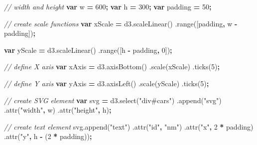 \documentclass[openany]{book}
\newenvironment{Shaded}{\begin{snugshade}}{\end{snugshade}}
\newcommand{\AttributeTok}[1]{\textcolor[rgb]{0.77,0.63,0.00}{#1}}
\newcommand{\CommentTok}[1]{\textcolor[rgb]{0.56,0.35,0.01}{\textit{#1}}}
\newcommand{\DecValTok}[1]{\textcolor[rgb]{0.00,0.00,0.81}{#1}}
\newcommand{\KeywordTok}[1]{\textcolor[rgb]{0.13,0.29,0.53}{\textbf{#1}}}
\newcommand{\NormalTok}[1]{#1}
\newcommand{\OperatorTok}[1]{\textcolor[rgb]{0.81,0.36,0.00}{\textbf{#1}}}
\newcommand{\StringTok}[1]{\textcolor[rgb]{0.31,0.60,0.02}{#1}}
\newcommand{\VariableTok}[1]{\textcolor[rgb]{0.00,0.00,0.00}{#1}}
\begin{document}
\begin{Shaded}
\begin{Highlighting}[]
\CommentTok{// width and height}
\KeywordTok{var}\NormalTok{ w }\OperatorTok{=} \DecValTok{600}\OperatorTok{;}
\KeywordTok{var}\NormalTok{ h }\OperatorTok{=} \DecValTok{300}\OperatorTok{;}
\KeywordTok{var}\NormalTok{ padding }\OperatorTok{=} \DecValTok{50}\OperatorTok{;}

\CommentTok{// create scale functions}
\KeywordTok{var}\NormalTok{ xScale }\OperatorTok{=} \VariableTok{d3}\NormalTok{.}\AttributeTok{scaleLinear}\NormalTok{()}
\NormalTok{  .}\AttributeTok{range}\NormalTok{([padding}\OperatorTok{,}\NormalTok{ w }\OperatorTok{-}\NormalTok{ padding])}\OperatorTok{;}

\KeywordTok{var}\NormalTok{ yScale }\OperatorTok{=} \VariableTok{d3}\NormalTok{.}\AttributeTok{scaleLinear}\NormalTok{()}
\NormalTok{  .}\AttributeTok{range}\NormalTok{([h }\OperatorTok{-}\NormalTok{ padding}\OperatorTok{,} \DecValTok{0}\NormalTok{])}\OperatorTok{;}

\CommentTok{// define X axis}
\KeywordTok{var}\NormalTok{ xAxis }\OperatorTok{=} \VariableTok{d3}\NormalTok{.}\AttributeTok{axisBottom}\NormalTok{()}
\NormalTok{  .}\AttributeTok{scale}\NormalTok{(xScale)}
\NormalTok{  .}\AttributeTok{ticks}\NormalTok{(}\DecValTok{5}\NormalTok{)}\OperatorTok{;}

\CommentTok{// define Y axis}
\KeywordTok{var}\NormalTok{ yAxis }\OperatorTok{=} \VariableTok{d3}\NormalTok{.}\AttributeTok{axisLeft}\NormalTok{()}
\NormalTok{  .}\AttributeTok{scale}\NormalTok{(yScale)}
\NormalTok{  .}\AttributeTok{ticks}\NormalTok{(}\DecValTok{5}\NormalTok{)}\OperatorTok{;}

\CommentTok{// create SVG element}
\KeywordTok{var}\NormalTok{ svg }\OperatorTok{=} \VariableTok{d3}\NormalTok{.}\AttributeTok{select}\NormalTok{(}\StringTok{"div#cars"}\NormalTok{)}
\NormalTok{  .}\AttributeTok{append}\NormalTok{(}\StringTok{"svg"}\NormalTok{)}
\NormalTok{  .}\AttributeTok{attr}\NormalTok{(}\StringTok{"width"}\OperatorTok{,}\NormalTok{ w)}
\NormalTok{  .}\AttributeTok{attr}\NormalTok{(}\StringTok{"height"}\OperatorTok{,}\NormalTok{ h)}\OperatorTok{;}

\CommentTok{// create text element}
\VariableTok{svg}\NormalTok{.}\AttributeTok{append}\NormalTok{(}\StringTok{"text"}\NormalTok{)}
\NormalTok{  .}\AttributeTok{attr}\NormalTok{(}\StringTok{"id"}\OperatorTok{,} \StringTok{"nm"}\NormalTok{)}
\NormalTok{  .}\AttributeTok{attr}\NormalTok{(}\StringTok{"x"}\OperatorTok{,} \DecValTok{2} \OperatorTok{*}\NormalTok{ padding)}
\NormalTok{  .}\AttributeTok{attr}\NormalTok{(}\StringTok{"y"}\OperatorTok{,}\NormalTok{ h }\OperatorTok{-}\NormalTok{ (}\DecValTok{2} \OperatorTok{*}\NormalTok{ padding))}\OperatorTok{;}


\end{Highlighting}
\end{Shaded}
\end{document}

